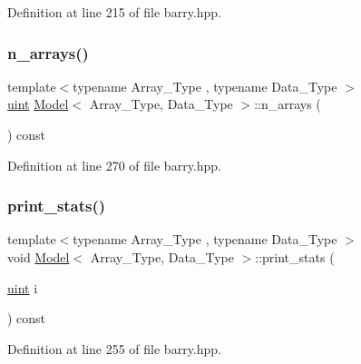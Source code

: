 Definition at line 215 of file barry.\+hpp.

\mbox{\label{classbarry_1_1_model_a35678412d71c9f96aa19099c72179f3d}} 
\subsubsection{\texorpdfstring{n\+\_\+arrays()}{n\_arrays()}}
{\footnotesize\ttfamily template$<$typename Array\+\_\+\+Type , typename Data\+\_\+\+Type $>$ \\
\hyperlink{namespacebarry_a11dfc53ddb4672278319aa04f1e09a6c}{uint} \hyperlink{classbarry_1_1_model}{Model}$<$ Array\+\_\+\+Type, Data\+\_\+\+Type $>$\+::n\+\_\+arrays (\begin{DoxyParamCaption}{ }\end{DoxyParamCaption}) const\hspace{0.3cm}{\ttfamily [inline]}}



Definition at line 270 of file barry.\+hpp.

\mbox{\label{classbarry_1_1_model_a1109a7cacf9993aa3189240bc41d5bec}} 
\subsubsection{\texorpdfstring{print\+\_\+stats()}{print\_stats()}}
{\footnotesize\ttfamily template$<$typename Array\+\_\+\+Type , typename Data\+\_\+\+Type $>$ \\
void \hyperlink{classbarry_1_1_model}{Model}$<$ Array\+\_\+\+Type, Data\+\_\+\+Type $>$\+::print\+\_\+stats (\begin{DoxyParamCaption}\item[{\hyperlink{namespacebarry_a11dfc53ddb4672278319aa04f1e09a6c}{uint}}]{i }\end{DoxyParamCaption}) const\hspace{0.3cm}{\ttfamily [inline]}}



Definition at line 255 of file barry.\+hpp.

\mbox{\label{classbarry_1_1_model_ab128d184427583d7b0e296a668047200}} 
